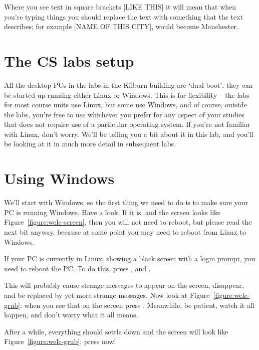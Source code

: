 Where you see text in square brackets [LIKE THIS] it will mean that when you're typing things you should replace the text with something that the text describes; for example [NAME OF THIS CITY], would become Manchester.

\section{The CS labs setup}

All the desktop PCs in the labs in the Kilburn building are
`dual-boot': they can be started up running either Linux or
Windows. This is for flexibility -- the labs for most course units  use
Linux, but some use Windows, and of course, outside the labs, you're free to use
whichever you prefer for any aspect of your studies that does not require use of a particular operating system. If you're not
familiar with Linux, don't worry. We'll be telling you a bit about it
in this lab, and you'll be looking at it in much more detail in subsequent labs.

\section{Using Windows}
\label{sec:using-windows}

We'll start with Windows, so the first thing we need to do is to make
sure your PC is running Windows. Have a look. If it is, and the screen
looks like Figure~\ref{figure:welc-screen}, then you will not need to
reboot, but please read the next bit anyway, because at some point you
may need to reboot from Linux to Windows.
        
If your PC is currently in Linux, showing a black screen with a login prompt,  you need to reboot the PC. To do
this, press ,  and .

This will probably cause strange messages to appear on the screen,
disappear, and be replaced by yet more strange messages. Now look at Figure~\ref{figure:welc-grub}: when you see that on the screen press . Meanwhile, be patient,
watch it all happen, and don't worry what it all means.

After a while,
everything should settle down and the screen will look like
Figure~\ref{figure:welc-grub}; press  now!


